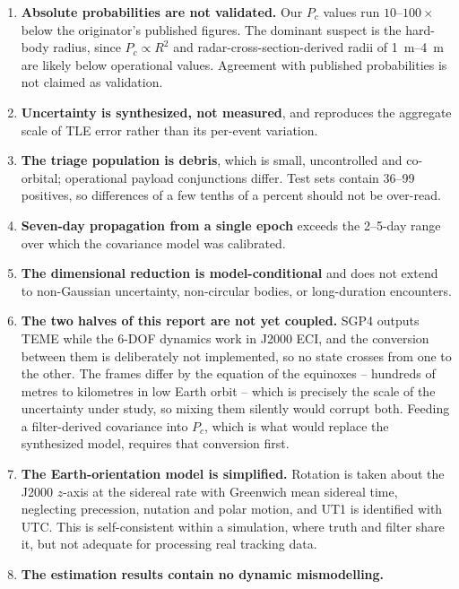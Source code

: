 \documentclass[11pt]{article}
\newcommand{\Pc}{P_c}
\begin{document}
\begin{enumerate}
  \item \textbf{Absolute probabilities are not validated.} Our $\Pc$ values
        run $10$--$100\times$ below the originator's published figures. The
        dominant suspect is the hard-body radius, since
        $\Pc \propto R^2$ and radar-cross-section-derived radii of
        \SIrange{1}{4}{\meter} are likely below operational values.
        Agreement with published probabilities is not claimed as validation.
  \item \textbf{Uncertainty is synthesized, not measured}, and reproduces
        the aggregate scale of TLE error rather than its per-event
        variation.
  \item \textbf{The triage population is debris}, which is small,
        uncontrolled and co-orbital; operational payload conjunctions
        differ. Test sets contain 36--99 positives, so differences of a few
        tenths of a percent should not be over-read.
  \item \textbf{Seven-day propagation from a single epoch} exceeds the
        \numrange{2}{5}-day range over which the covariance model was
        calibrated.
  \item \textbf{The dimensional reduction is model-conditional} and does not
        extend to non-Gaussian uncertainty, non-circular bodies, or
        long-duration encounters.
  \item \textbf{The two halves of this report are not yet coupled.} SGP4
        outputs TEME while the 6-DOF dynamics work in J2000 ECI, and the
        conversion between them is deliberately not implemented, so no state
        crosses from one to the other. The frames differ by the equation of
        the equinoxes -- hundreds of metres to kilometres in low Earth orbit
        -- which is precisely the scale of the uncertainty under study, so
        mixing them silently would corrupt both. Feeding a filter-derived
        covariance into $\Pc$, which is what would replace the synthesized
        model, requires that conversion first.
  \item \textbf{The Earth-orientation model is simplified.} Rotation is
        taken about the J2000 $z$-axis at the sidereal rate with Greenwich
        mean sidereal time, neglecting precession, nutation and polar motion,
        and UT1 is identified with UTC. This is self-consistent within a
        simulation, where truth and filter share it, but not adequate for
        processing real tracking data.
  \item \textbf{The estimation results contain no dynamic mismodelling.}

\end{enumerate}
\end{document}
